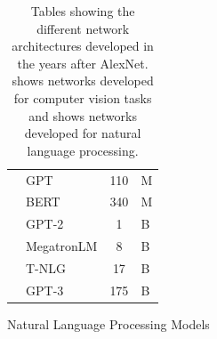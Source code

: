 \begin{table}[t]
\begin{subfigure}[b]{\textwidth}
\begin{tabular}{
      L{5cm}
      L{3cm}
      S[table-format=3.0, table-text-alignment=left]@{\,}
      s[table-unit-alignment=left]
    }
      \citet{radford2018improving}   & GPT        & 110  & \si{M} \\
      \citet{devlin2019bert}         & BERT       & 340  & \si{M} \\
      \citet{radford2019language}    & GPT-2      &   1  & \si{B} \\
      \citet{shoeybi2019megatron}    & MegatronLM &   8  & \si{B} \\
      \citet{rosset2020turingnlg}    & T-NLG      &  17  & \si{B} \\
      \citet{brown2020language}      & GPT-3      & 175  & \si{B} \\
      \bottomrule
    \end{tabular}
    \caption{Natural Language Processing Models}
    \label{table:ch1-networks_parameters_nlp}
  \end{subfigure}
  \caption{
    Tables showing the different network architectures developed in the years after AlexNet.
     shows networks developed for computer vision tasks and  shows networks developed for natural language processing.
  }
  \label{table:ch1-networks_parameters}
\end{table}


